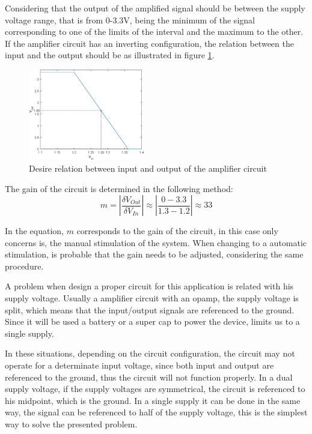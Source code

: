 Considering that the output of the amplified signal should be between the supply voltage range, that is from 0-3.3V, being the minimum of the signal corresponding to one of the limits of the interval and the maximum to the other. If the amplifier circuit has an inverting configuration, the relation between the input and the output should be as illustrated in figure \ref{fig:inVSout}.
\begin{figure}[]
    \centering
    \includegraphics[width=0.45\textwidth]{Chapters/4CHP/Figures/inOut.eps}
    \caption{Desire relation between input and output of the amplifier circuit}
    \label{fig:inVSout}
\end{figure}

The gain of the circuit is determined in the following method:
\begin{equation}
   m = |\frac{\delta V_{Out}}{\delta V_{In}}| \approx |\frac{0-3.3}{1.3-1.2}| \approx 33
\end{equation}

In the equation, $m$ corresponds to the gain of the circuit, in this case only concerns is, the manual stimulation of the system. When changing to a automatic stimulation, is probable that the gain needs to be adjusted, considering the same procedure.

A problem when design a proper circuit for this application is related with his supply voltage. Usually a amplifier circuit with an \acrshort{opamp}, the supply voltage is split, which means that the input/output signals are referenced to the ground. Since it will be used a battery or a super cap to power the device, limits us to a single supply.

In these situations, depending on the circuit configuration, the circuit may not operate for a determinate input voltage, since both input and output are referenced to the ground, thus the circuit will not function properly. In a dual supply voltage, if the supply voltages are symmetrical, the circuit is referenced to his midpoint, which is the ground. In a single supply it can be done in the same way, the signal can be referenced to half of the supply voltage, this is the simplest way to solve the presented problem. 

